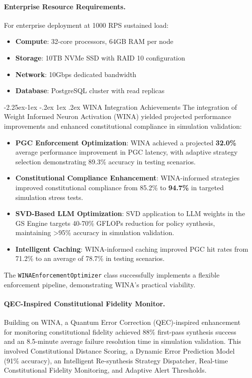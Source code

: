 \documentclass[manuscript,screen,9pt]{acmart}
\makeatletter
\renewcommand\subsection{\@startsection{subsection}{2}{\z@}%
  {-2.25ex\@plus -1ex \@minus -.2ex}%
  {1ex \@plus .2ex}%
  {\normalfont\large\bfseries}}
\makeatother
\begin{document}
\paragraph{Enterprise Resource Requirements.}
For enterprise deployment at 1000 RPS sustained load:
\begin{itemize}[leftmargin=*,itemsep=1pt,parsep=1pt]
	\item \textbf{Compute}: 32-core processors, 64GB RAM per node
	\item \textbf{Storage}: 10TB NVMe SSD with RAID 10 configuration
	\item \textbf{Network}: 10Gbps dedicated bandwidth
	\item \textbf{Database}: PostgreSQL cluster with read replicas
\end{itemize}

\subsection{WINA Integration Achievements}
\label{subsec:wina_integration_achievements}
The integration of Weight Informed Neuron Activation (WINA) yielded projected performance improvements and enhanced constitutional compliance in simulation validation:
\begin{itemize}[leftmargin=*,itemsep=1pt,parsep=1pt]
	\item \textbf{PGC Enforcement Optimization}: WINA achieved a projected \textbf{32.0\%} average performance improvement in PGC latency, with adaptive strategy selection demonstrating 89.3\% accuracy in testing scenarios.
	\item \textbf{Constitutional Compliance Enhancement}: WINA-informed strategies improved constitutional compliance from 85.2\% to \textbf{94.7\%} in targeted simulation stress tests.
	\item \textbf{SVD-Based LLM Optimization}: SVD application to LLM weights in the GS Engine targets 40-70\% GFLOPs reduction for policy synthesis, maintaining >95\% accuracy in simulation validation.
	\item \textbf{Intelligent Caching}: WINA-informed caching improved PGC hit rates from 71.2\% to an average of 78.7\% in testing scenarios.
\end{itemize}
The \texttt{WINAEnforcementOptimizer} class successfully implements a flexible enforcement pipeline, demonstrating WINA's practical viability.

\paragraph{QEC-Inspired Constitutional Fidelity Monitor.} Building on WINA, a Quantum Error Correction (QEC)-inspired enhancement for monitoring constitutional fidelity achieved 88\% first-pass synthesis success and an 8.5-minute average failure resolution time in simulation validation. This involved Constitutional Distance Scoring, a Dynamic Error Prediction Model (91\% accuracy), an Intelligent Re-synthesis Strategy Dispatcher, Real-time Constitutional Fidelity Monitoring, and Adaptive Alert Thresholds.
\end{document}
